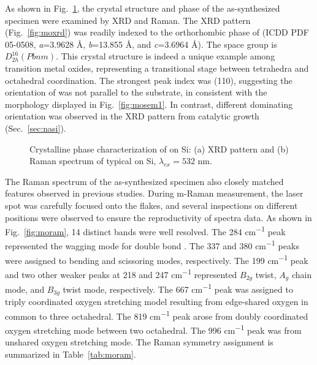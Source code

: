 As shown in Fig.~\ref{fig:mooxch}, the crystal structure and phase of the as-synthesized specimen were examined by XRD and Raman. The XRD pattern (Fig.~\ref{fig:moxrd}) was readily indexed to the orthorhombic phase of  (ICDD PDF 05-0508, \emph{a}=3.9628 \AA, \emph{b}=13.855 \AA, and \emph{c}=3.6964 \AA). The space group is $D_{2h}^{16}(Pbnm)$. This crystal structure is indeed a unique example among transition metal oxides, representing a transitional stage between tetrahedra and octahedral coordination.\cite{Itoh2001a} The strongest peak index was (110), suggesting the orientation of  was not parallel to the substrate, in consistent with the morphology displayed in Fig.~\ref{fig:mosem1}. In contrast, different dominating orientation was observed in the XRD pattern from catalytic growth (Sec.~\ref{sec:nasi}).
\begin{figure}[htb]
\centering
{}\hspace{0.04\textwidth}
\caption[Crystalline phase characterization of  on Si]{Crystalline phase characterization of  on Si: (a) XRD pattern and (b) Raman spectrum of typical  on Si, $\lambda_{ex} = 532$ nm.}
\label{fig:mooxch}
\end{figure}
The Raman spectrum of the as-synthesized specimen also closely matched  features observed in previous studies.\cite{Dixit1986,Silveira2012} During m-Raman measurement, the laser spot was carefully focused onto the  flakes, and several inspections on different positions were observed to ensure the reproductivity of spectra data. As shown in Fig.~\ref{fig:moram}, 14 distinct bands were well resolved. The 284 \si{cm^{-1}} peak represented the wagging mode for double bond . The 337 and 380  \si{cm^{-1}} peaks were assigned to  bending and scissoring modes, respectively. The 199 \si{cm^{-1}} peak and two other weaker peaks at 218 and 247 \si{cm^{-1}} represented  $B_{2g}$ twist, $A_g$ chain mode, and  $B_{3g}$ twist mode, respectively. The 667 \si{cm^{-1}} peak was assigned to triply coordinated oxygen stretching model resulting from edge-shared oxygen in common to three octahedral. The 819 \si{cm^{-1}} peak arose from doubly coordinated oxygen stretching mode between two octahedral. The 996 \si{cm^{-1}} peak was from unshared oxygen stretching mode.\cite{Siciliano2009} The Raman symmetry assignment is summarized in Table~\ref{tab:moram}.
